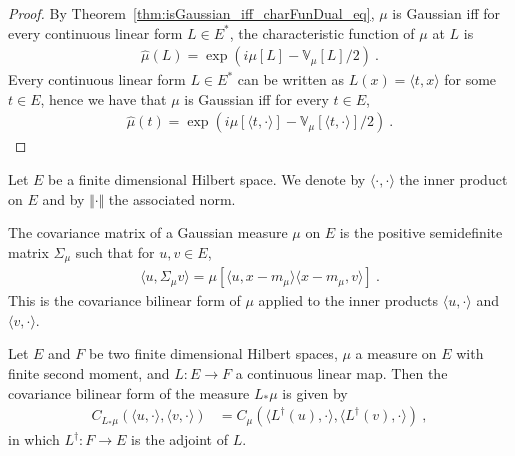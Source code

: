 \begin{proof}
By Theorem~\ref{thm:isGaussian_iff_charFunDual_eq}, $\mu$ is Gaussian iff for every continuous linear form $L \in E^*$, the characteristic function of $\mu$ at $L$ is
\begin{align*}
  \hat{\mu}(L) = \exp\left(i \mu[L] - \mathbb{V}_\mu[L] / 2\right) \: .
\end{align*}
Every continuous linear form $L \in E^*$ can be written as $L(x) = \langle t, x \rangle$ for some $t \in E$, hence we have that $\mu$ is Gaussian iff for every $t \in E$,
\begin{align*}
  \hat{\mu}(t) = \exp\left(i \mu[\langle t, \cdot \rangle] - \mathbb{V}_\mu[\langle t, \cdot \rangle] / 2\right) \: .
\end{align*}
\end{proof}

Let $E$ be a finite dimensional Hilbert space. We denote by $\langle \cdot, \cdot \rangle$ the inner product on $E$ and by $\Vert \cdot \Vert$ the associated norm.


\begin{definition}\label{def:covMatrix}
  \leanok
The covariance matrix of a Gaussian measure $\mu$ on $E$ is the positive semidefinite matrix $\Sigma_\mu$ such that for $u, v \in E$,
\begin{align*}
  \langle u, \Sigma_\mu v\rangle = \mu[\langle u, x - m_\mu \rangle \langle x - m_\mu, v \rangle] \: .
\end{align*}
This is the covariance bilinear form of $\mu$ applied to the inner products $\langle u, \cdot \rangle$ and $\langle v, \cdot \rangle$.
\end{definition}


\begin{lemma}\label{lem:covarianceBilin_map}
  \leanok
Let $E$ and $F$ be two finite dimensional Hilbert spaces, $\mu$ a measure on $E$ with finite second moment, and $L : E \to F$ a continuous linear map.
Then the covariance bilinear form of the measure $L_*\mu$ is given by
\begin{align*}
  C_{L_*\mu}(\langle u, \cdot\rangle, \langle v, \cdot\rangle)
  &= C_\mu(\langle L^\dagger(u), \cdot\rangle, \langle L^\dagger(v), \cdot\rangle)
  \: ,
\end{align*}
in which $L^\dagger : F \to E$ is the adjoint of $L$.
\end{lemma}

